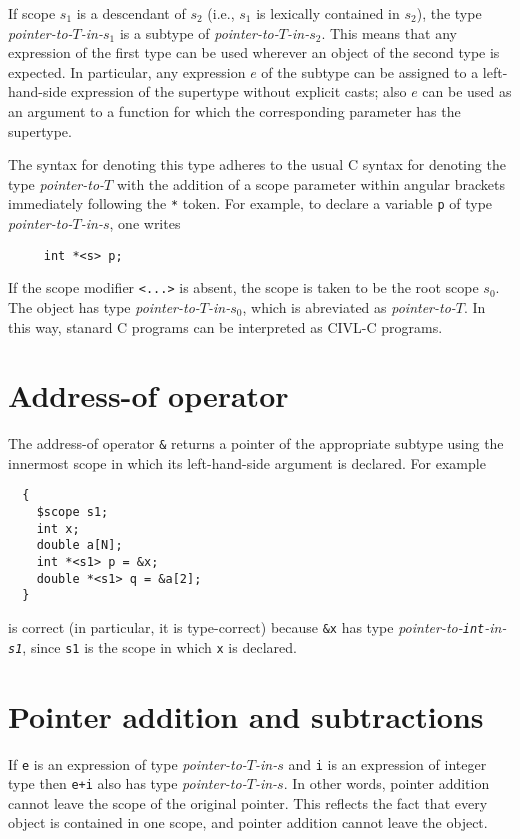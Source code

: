 If scope $s_1$ is a descendant of $s_2$ (i.e., $s_1$ is lexically
contained in $s_2$), the type \emph{pointer-to-$T$-in-$s_1$} is a
subtype of \emph{pointer-to-$T$-in-$s_2$}.  This means that any
expression of the first type can be used wherever an object of the
second type is expected.  In particular, any expression $e$ of the
subtype can be assigned to a left-hand-side expression of the
supertype without explicit casts; also $e$ can be used as an argument
to a function for which the corresponding parameter has the supertype.

The syntax for denoting this type adheres to the usual C syntax for
denoting the type \emph{pointer-to-$T$} with the addition of a scope
parameter within angular brackets immediately following the \texttt{*}
token.  For example, to declare a variable \texttt{p} of type
\emph{pointer-to-$T$-in-$s$}, one writes
\begin{verbatim}
     int *<s> p;
\end{verbatim}
If the scope modifier \texttt{<...>} is absent, the scope is taken to
be the root scope $s_0$.  The object has type
\emph{pointer-to-$T$-in-$s_0$}, which is abreviated as
\emph{pointer-to-$T$}.  In this way, stanard C programs can be
interpreted as CIVL-C programs.

\section{Address-of operator}

The address-of operator \texttt{\&} returns a pointer of the
appropriate subtype using the innermost scope in which its left-hand-side
argument is declared.  For example

\begin{verbatim}
  {
    $scope s1;
    int x;
    double a[N];
    int *<s1> p = &x;
    double *<s1> q = &a[2];
  }
\end{verbatim}
is correct (in particular, it is type-correct) because \texttt{\&x}
has type \emph{pointer-to-\texttt{int}-in-\texttt{s1}}, since
\texttt{s1} is the scope in which \texttt{x} is declared.

\section{Pointer addition and subtractions}

If \texttt{e} is an expression of type \emph{pointer-to-$T$-in-$s$}
and \texttt{i} is an expression of integer type then \texttt{e+i} also
has type \emph{pointer-to-$T$-in-$s$}.  In other words, pointer
addition cannot leave the scope of the original pointer.  This
reflects the fact that every object is contained in one scope, and
pointer addition cannot leave the object.


